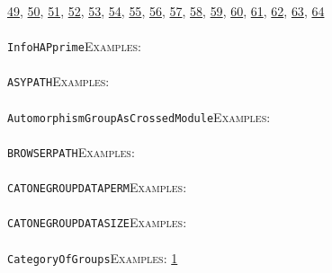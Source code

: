 \documentclass[a4paper,11pt]{report}
\begin{document}
{{\href{../www/SideLinks/About/aboutSpaceGroup.html} {49}{\nobreakspace}, \href{../www/SideLinks/About/aboutFunctorial.html} {50}{\nobreakspace}, \href{../www/SideLinks/About/aboutSuperperfect.html} {51}{\nobreakspace}, \href{../www/SideLinks/About/aboutGouter.html} {52}{\nobreakspace}, \href{../www/SideLinks/About/aboutSurvey.html} {53}{\nobreakspace}, \href{../www/SideLinks/About/aboutGraphsOfGroups.html} {54}{\nobreakspace}, \href{../www/SideLinks/About/aboutTDA.html} {55}{\nobreakspace}, \href{../www/SideLinks/About/aboutIntro.html} {56}{\nobreakspace}, \href{../www/SideLinks/About/aboutKnots.html} {57}{\nobreakspace}, \href{../www/SideLinks/About/aboutTensorSquare.html} {58}{\nobreakspace}, \href{../www/SideLinks/About/aboutKnotsQuandles.html} {59}{\nobreakspace}, \href{../www/SideLinks/About/aboutTopology.html} {60}{\nobreakspace}, \href{../www/SideLinks/About/aboutLieCovers.html} {61}{\nobreakspace}, \href{../www/SideLinks/About/aboutTorAndExt.html} {62}{\nobreakspace}, \href{../www/SideLinks/About/aboutLie.html} {63}{\nobreakspace}, \href{../www/SideLinks/About/aboutTwistedCoefficients.html} {64}{\nobreakspace} \\
 \\
 \texttt{InfoHAPprime}{\nobreakspace}{\nobreakspace}{\nobreakspace}{\nobreakspace}\textsc{Examples:} \\
 \\
 \texttt{ASY{\textunderscore}PATH}{\nobreakspace}{\nobreakspace}{\nobreakspace}{\nobreakspace}\textsc{Examples:} \\
 \\
 \texttt{AutomorphismGroupAsCrossedModule}{\nobreakspace}{\nobreakspace}{\nobreakspace}{\nobreakspace}\textsc{Examples:} \\
 \\
 \texttt{BROWSER{\textunderscore}PATH}{\nobreakspace}{\nobreakspace}{\nobreakspace}{\nobreakspace}\textsc{Examples:} \\
 \\
 \texttt{CATONEGROUP{\textunderscore}DATA{\textunderscore}PERM}{\nobreakspace}{\nobreakspace}{\nobreakspace}{\nobreakspace}\textsc{Examples:} \\
 \\
 \texttt{CATONEGROUP{\textunderscore}DATA{\textunderscore}SIZE}{\nobreakspace}{\nobreakspace}{\nobreakspace}{\nobreakspace}\textsc{Examples:} \\
 \\
 \texttt{Category{\textunderscore}Of{\textunderscore}Groups}{\nobreakspace}{\nobreakspace}{\nobreakspace}{\nobreakspace}\textsc{Examples:} \href{../www/SideLinks/About/aboutAbelianCategories.html} {1}{\nobreakspace} \\
}}
\end{document}
